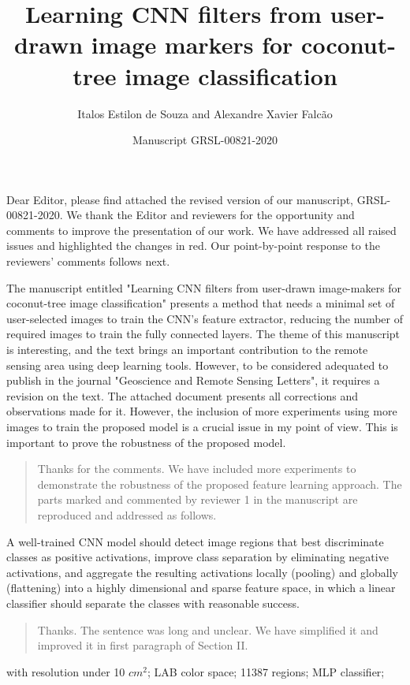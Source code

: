 \documentclass[a4paper,12pt]{article}
\title{Learning CNN filters from user-drawn image markers for coconut-tree image classification}
\author{Italos Estilon de Souza and Alexandre Xavier Falc\~{a}o}
\date{Manuscript GRSL-00821-2020}
\newcommand{\rwr}[1]{\par \medskip \noindent {\bf Reviewer #1: }}
\newcommand{\ans}{\smallskip\begin{quote}  \noindent }
\newcommand{\eans}{\end{quote}}
\begin{document}
\maketitle

Dear Editor, please find attached the revised version of our manuscript, GRSL-00821-2020. We thank the Editor and
reviewers for the opportunity and comments to improve the presentation of our work. We have addressed all raised issues and highlighted the changes in red. Our point-by-point response to the reviewers' comments follows next. 

\rwr{1} 
The manuscript entitled "Learning CNN ﬁlters from user-drawn image-makers for coconut-tree image classiﬁcation" presents a method that needs a minimal set of user-selected images to train the CNN’s feature extractor, reducing the number of required images to train the fully connected layers. The theme of this manuscript is interesting, and the text brings an important contribution to the remote sensing area using deep learning tools. However, to be considered adequated to publish in the journal "Geoscience and Remote Sensing Letters", it requires a revision on the text. The attached document presents all corrections and observations made for it. However, the inclusion of more experiments using more images to train the proposed model is a crucial issue in my point of view. This is important to prove the robustness of the proposed model.

\ans 

Thanks for the comments. We have included more experiments to demonstrate the robustness of the proposed feature learning approach. The parts marked and commented by reviewer 1 in the manuscript are reproduced and addressed as follows.

\eans


\rwr{1} A well-trained CNN model should detect image regions that best discriminate classes as positive activations, improve class separation by eliminating negative activations, and aggregate the resulting activations locally (pooling) and globally (flattening) into a highly dimensional and sparse feature space, in which a linear classifier should separate the classes with reasonable success.

\ans  Thanks. The sentence was long and unclear. We have simplified it and improved it in first paragraph of Section II.
\eans

\rwr{1} with resolution under 10 $cm^2$; LAB color space; 11387 regions; MLP classifier; 
\end{document}
